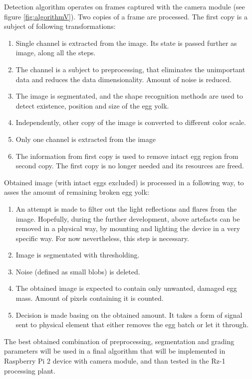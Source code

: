 \documentclass[12pt,twoside,a4paper]{article}
\begin{document}
Detection algorithm operates on frames captured with the camera module (see figure \ref{fig:algorithmV}).
Two copies of a frame are processed. The first copy is a subject of following transformations:
\begin{enumerate}
  \item Single channel is extracted from the image.
  Its state is passed further as image, along all the steps.
  \item The channel is a subject to preprocessing, that eliminates the unimportant data and reduces the data dimensionality. 
  Amount of noise is reduced.
  \item The image is segmentated, and the shape recognition methods are used to detect existence, position and size of the egg yolk.
  \item Independently, other copy of the image is converted to different color scale.
  \item Only one channel is extracted from the image
  \item The information from first copy is used to remove intact egg region from second copy. The first copy is no longer needed and its resources are freed.
\end{enumerate}

Obtained image (with intact eggs excluded) is processed in a following way, to asses the amount of remaining broken egg yolk: 

\begin{enumerate}
  \item An attempt is made to filter out the light reflections and flares from the image.
  Hopefully, during the further development, above artefacts can be removed in a physical way, by mounting and lighting the device in a very specific way.
  For now nevertheless, this step is necessary.
  \item Image is segmentated with thresholding.
  \item Noise (defined as small blobs) is deleted.
  \item The obtained image is expected to contain only unwanted, damaged egg mass.
  Amount of pixels containing it is counted.
  \item Decision is made basing on the obtained amount.
  It takes a form of signal sent to physical element that either removes the egg batch or let it through.
\end{enumerate}

The best obtained combination of preprocessing, segmentation and grading parameters will be used in a final algorithm that will be implemented in Raspberry Pi 2 device with camera module, and than tested in the Rz-1 processing plant.
\end{document}
